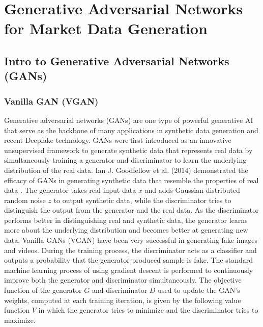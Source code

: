 \chapter{Generative Adversarial Networks for Market Data Generation}

\section{Intro to Generative Adversarial Networks (GANs)}
\subsection{Vanilla GAN (VGAN)}
Generative adversarial networks (GANs) are one type of powerful generative AI that serve as the backbone of many applications in synthetic data generation and recent Deepfake technology. GANs were first introduced as an innovative unsupervised framework to generate synthetic data that represents real data by simultaneously training a generator and discriminator to learn the underlying distribution of the real data. Ian J. Goodfellow et al. (2014) demonstrated the efficacy of GANs in generating synthetic data that resemble the properties of real data \cite{gans}. The generator takes real input data $x$ and adds Gaussian-distributed random noise $z$ to output synthetic data, while the discriminator tries to distinguish the output from the generator and the real data. As the discriminator performs better in distinguishing real and synthetic data, the generator learns more about the underlying distribution and becomes better at generating new data. Vanilla GANs (VGAN) have been very successful in generating fake images and videos. During the training process, the discriminator acts as a classifier and outputs a probability that the generator-produced sample is fake. The standard machine learning process of using gradient descent is performed to continuously improve both the generator and discriminator simultaneously. The objective function of the generator $G$ and discriminator $D$ used to update the GAN's weights, computed at each training iteration, is given by the following value function $V$ in which the generator tries to minimize and the discriminator tries to maximize.
